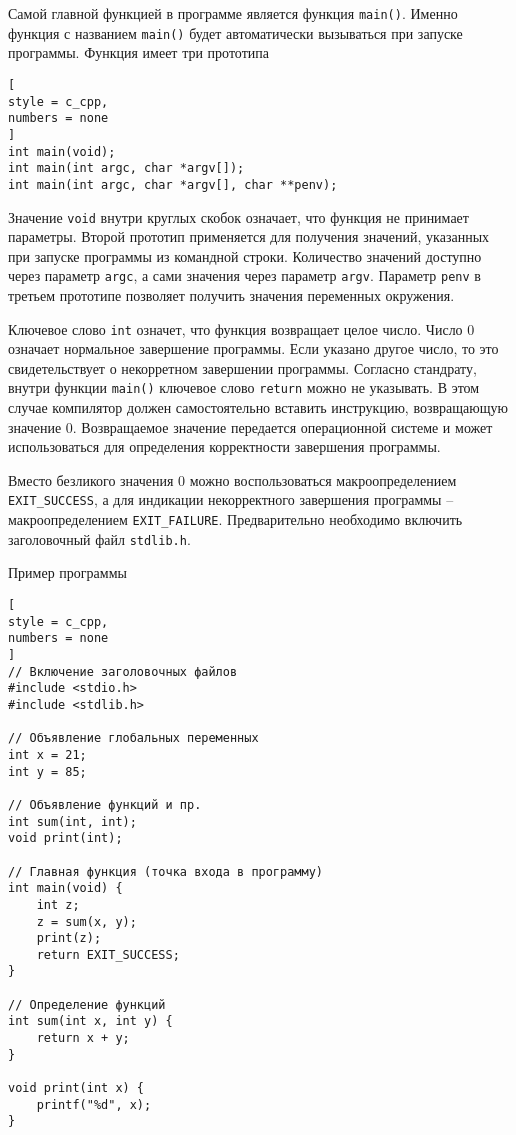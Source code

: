 \documentclass[%
	11pt,
	a4paper,
	utf8,
		]{article}
\begin{document}
Самой главной функцией в программе является функция \verb|main()|. Именно функция с названием \verb|main()| будет автоматически вызываться при запуске программы. Функция имеет три прототипа
\begin{lstlisting}[
style = c_cpp,
numbers = none
]
int main(void);
int main(int argc, char *argv[]);
int main(int argc, char *argv[], char **penv);
\end{lstlisting}

Значение \verb|void| внутри круглых скобок означает, что функция не принимает параметры. Второй прототип применяется для получения значений, указанных при запуске программы из командной строки. Количество значений доступно через параметр \verb|argc|, а сами значения через параметр \verb|argv|. Параметр \verb|penv| в третьем прототипе позволяет получить значения переменных окружения.

Ключевое слово \verb|int| означет, что функция возвращает целое число. Число 0 означает нормальное завершение программы. Если указано другое число, то это свидетельствует о некорретном завершении программы. Согласно стандрату, внутри функции \verb|main()| ключевое слово \verb|return| можно не указывать. В этом случае компилятор должен самостоятельно вставить инструкцию, возвращающую значение 0. Возвращаемое значение передается операционной системе и может использоваться для определения корректности завершения программы.

Вместо безликого значения 0 можно воспользоваться макроопределением \verb|EXIT_SUCCESS|, а для индикации некорректного завершения программы -- макроопределением \verb|EXIT_FAILURE|. Предварительно необходимо включить заголовочный файл \verb|stdlib.h|.

Пример программы
\begin{lstlisting}[
style = c_cpp,
numbers = none
]
// Включение заголовочных файлов
#include <stdio.h>
#include <stdlib.h>

// Объявление глобальных переменных
int x = 21;
int y = 85;

// Объявление функций и пр.
int sum(int, int);
void print(int);

// Главная функция (точка входа в программу)
int main(void) {
    int z;
    z = sum(x, y);
    print(z);
    return EXIT_SUCCESS;
}

// Определение функций
int sum(int x, int y) {
    return x + y;
}

void print(int x) {
    printf("%d", x);
}
\end{lstlisting}
\end{document}
